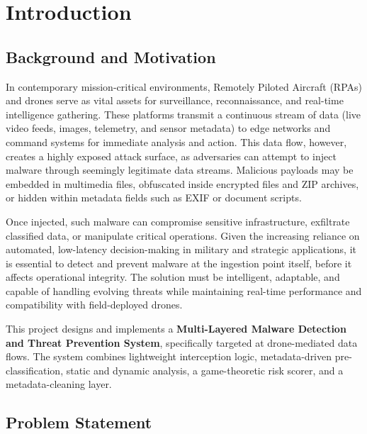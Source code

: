 \documentclass[12pt, a4paper]{report}
\begin{document}
\vfill

\cleardoublepage
{}
\setcounter{page}{1}


\chapter{Introduction}
\label{chap:intro}

\section{Background and Motivation}
In contemporary mission-critical environments, Remotely Piloted Aircraft
(RPAs) and drones serve as vital assets for surveillance, reconnaissance,
and real-time intelligence gathering. These platforms transmit a continuous
stream of data (live video feeds, images, telemetry, and sensor
metadata) to edge networks and command systems for immediate analysis and
action. This data flow, however, creates a highly exposed attack surface, as
adversaries can attempt to inject malware through seemingly legitimate data
streams. Malicious payloads may be embedded in multimedia files, obfuscated
inside encrypted files and ZIP archives, or hidden within metadata fields
such as EXIF or document scripts.

Once injected, such malware can compromise sensitive infrastructure,
exfiltrate classified data, or manipulate critical operations. Given the
increasing reliance on automated, low-latency decision-making in military and
strategic applications, it is essential to detect and prevent malware at the
ingestion point itself, before it affects operational integrity. The solution
must be intelligent, adaptable, and capable of handling evolving threats
while maintaining real-time performance and compatibility with
field-deployed drones.

This project designs and implements a
\textbf{Multi-Layered Malware Detection and Threat Prevention System},
specifically targeted at drone-mediated data flows. The system combines
lightweight interception logic, metadata-driven pre-classification, static
and dynamic analysis, a game-theoretic risk scorer, and a metadata-cleaning
layer.
\section{Problem Statement}
\end{document}

